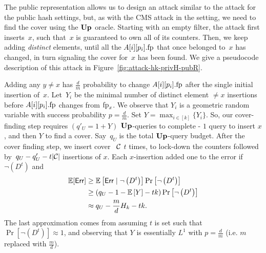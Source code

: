 \begin{figure*}[ht!]
	\caption{Cover Set Attack for the HK in private
		hash function and public representation setting. 
		The attack is parametrized with  the update query budget $q_U$. The attack uses the function Get-t$(.)$ from Figure \ref{fig:attack-hk-hfis}.
	}
	\label{fig:attack-hk-privH-pubR}
\end{figure*}
The public representation allows us to design an attack similar to the attack for the public hash settings, but, as with the CMS attack in the setting, we need to find the cover using the $\textup{\textbf{Up}}\hspace{0.5pt}$ oracle.
Starting with an empty filter, the attack first inserts~$x$, such that~$x$ is guaranteed to own all of its counters. Then, we keep adding \textit{distinct} elements, until all the $A[i][p_i].\textup{fp}$  that once belonged to~$x$ has changed, in turn signaling the cover for~$x$ has been found. We give a pseudocode description of this attack in Figure~\ref{fig:attack-hk-privH-pubR}.

Adding any $y \neq x$ has $\frac{d}{m}$ probability to change $A[i][p_i].\textup{fp}$ after the single initial insertion of~$x$. Let~$Y_i$ be the minimal number of distinct element $\neq x$ insertions before $A[i][p_i].\textup{fp}$ changes from $\textup{fp}_x$. We observe that $Y_i$ is a geometric random variable with success probability $p=\frac{d}{m}$. Set $Y=\max_{i \in [k]}\{Y_i\}$. So, our cover-finding step requires
$(q'_U  = 1+Y)$ $\textup{\textbf{Up}}\hspace{0.5pt}$-queries to complete - $1$ query to insert $x$, and then $Y$ to find a cover.
Say~$q_U$ is the total $\textup{\textbf{Up}}\hspace{0.5pt}$-query budget. After the cover finding step, we insert cover ~$\mathcal{C}$ $t$ times, to lock-down the counters followed by~$q_U - q_U' - t|\mathcal{C}|$ insertions of $x$. Each $x$-insertion added one to the error if $\lnot \left(D^t\right)$ and
\begin{align*}
	\mathbb{E}[\mathsf{Err}] &\geq \mathbb{E}\left[\mathsf{Err}  \mid \lnot \left(D^t\right)\right] \Pr\left[\lnot \left(D^t\right)\right] \\
	&\geq \left(q_U- 1- \mathbb{E}\left[Y \right] - tk\right)\Pr\left[\lnot \left(D^t\right)\right] \\
	&\approx q_U - \frac{m}{d} H_k-tk. 
\end{align*}
The last approximation comes from assuming $t$ is set such that $\Pr\left[\lnot \left(D^t\right)\right]\allowbreak \approx 1$, and observing that $Y$ is essentially $L^1$ with $p = \frac{d}{m}$ (i.e. $m$ replaced with $\frac{m}{d}$). 

